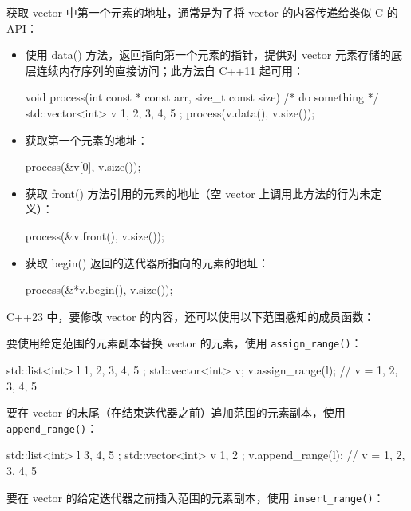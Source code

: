 获取 vector 中第一个元素的地址，通常是为了将 vector 的内容传递给类似 C 的 API：

\begin{itemize}
\item
使用 data() 方法，返回指向第一个元素的指针，提供对 vector 元素存储的底层连续内存序列的直接访问；此方法自 C++11 起可用：

\begin{cpp}
void process(int const * const arr, size_t const size)
{ /* do something */ }
std::vector<int> v{ 1, 2, 3, 4, 5 };
process(v.data(), v.size());
\end{cpp}

\item
获取第一个元素的地址：

\begin{cpp}
process(&v[0], v.size());
\end{cpp}

\item
获取 front() 方法引用的元素的地址（空 vector 上调用此方法的行为未定义）：

\begin{cpp}
process(&v.front(), v.size());
\end{cpp}

\item
获取 begin() 返回的迭代器所指向的元素的地址：

\begin{cpp}
process(&*v.begin(), v.size());
\end{cpp}
\end{itemize}

C++23 中，要修改 vector 的内容，还可以使用以下范围感知的成员函数：

要使用给定范围的元素副本替换 vector 的元素，使用 \verb|assign_range()|：

\begin{cpp}
std::list<int>   l{ 1, 2, 3, 4, 5 };
std::vector<int> v;
v.assign_range(l); // v = {1, 2, 3, 4, 5}
\end{cpp}

要在 vector 的末尾（在结束迭代器之前）追加范围的元素副本，使用 \verb|append_range()|：

\begin{cpp}
std::list<int>   l{ 3, 4, 5 };
std::vector<int> v{ 1, 2 };
v.append_range(l);  // v = {1, 2, 3, 4, 5}
\end{cpp}

要在 vector 的给定迭代器之前插入范围的元素副本，使用 \verb|insert_range()|：

